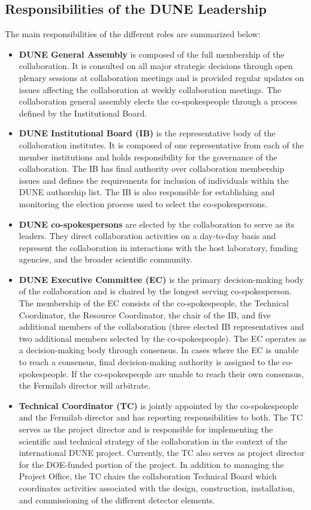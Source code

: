 \subsection{Responsibilities of the DUNE Leadership}

The main responsibilities of the different roles are summarized below:
\begin{itemize}
  \item \textbf{DUNE General Assembly} is composed of the full membership of the collaboration.  It is consulted on all major strategic decisions through open plenary sessions at collaboration meetings and is provided regular updates on issues affecting the collaboration at weekly collaboration meetings.  The collaboration general assembly elects the co-spokespeople through a process defined by the Institutional Board. 
  \item \textbf{DUNE Institutional Board (IB)} is the representative body of the collaboration institutes. It is composed of one representative from each of the member institutions and holds responsibility for the governance of the collaboration.  The IB has final authority over collaboration membership issues and defines the requirements for inclusion of individuals within the DUNE authorship list. The IB is also responsible    
for establishing and monitoring the election process used to select the co-spokespersons.  
  \item \textbf{DUNE co-spokespersons} are elected by the collaboration to serve as its leaders.  They direct collaboration activities on a day-to-day basis and represent the collaboration in interactions with the host laboratory, funding agencies, and the broader scientific community.
  \item \textbf{DUNE Executive Committee (EC)} is the primary decision-making body of the collaboration and is chaired by the longest serving co-spokesperson.  The membership of the EC consists of the co-spokespeople, the Technical Coordinator, the Resource Coordinator, the chair of the IB, and five additional members of the collaboration (three elected IB representatives and two additional members selected by the co-spokespeople).  The EC operates as a decision-making body through consensus.  In cases where the EC is unable to reach a consensus, final decision-making authority is assigned to the co-spokespeople.  If the co-spokespeople are unable to reach their own consensus, the Fermilab director will arbitrate.   
  \item \textbf{Technical Coordinator (TC)} is jointly appointed by the co-spokespeople and the Fermilab director and has reporting responsibilities to both.  The TC serves as the project director and is responsible for implementing the scientific and technical strategy of the collaboration in the context of the international DUNE project.  Currently, the TC also serves as project director for the DOE-funded portion of the project.  In addition to managing the Project Office, the TC chairs the collaboration Technical Board which coordinates activities associated with the design, construction, installation, and commissioning of the different detector elements.   

\end{itemize}

